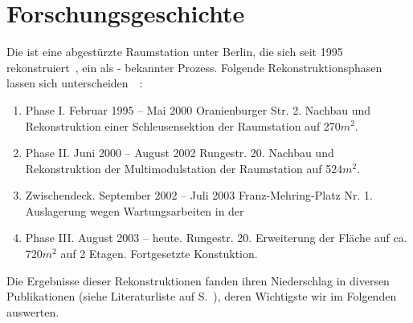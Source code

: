 \section*{Forschungsgeschichte}
\fancyhead[LO]{}

    Die  ist eine abgestürzte Raumstation unter Berlin, die sich seit 1995 rekonstruiert~\cite{cbasebook}, ein als  -  bekannter Prozess. Folgende Rekonstruktionsphasen  lassen sich unterscheiden~\cite{cbasepressemap}~\cite{cbasebook}:
    \begin{enumerate}
        \item Phase I.  Februar 1995 -- Mai 2000 Oranienburger Str. 2.  Nachbau und Rekonstruktion einer Schleusensektion der  Raumstation auf 270$m^2$.~\cite{cbasepressemap}~\cite{cbasebook} 
        \item Phase II.   Juni 2000 -- August 2002 Rungestr. 20.  Nachbau und Rekonstruktion der Multimodulstation  der  Raumstation auf 524$m^2$.~\cite{cbasepressemap}~\cite{cbasebook} 
        \item Zwischendeck.  September 2002 -- Juli 2003 Franz-Mehring-Platz Nr. 1. 
        Auslagerung wegen Wartungsarbeiten in der ~\cite{cbasepressemap}~\cite{cbasebook} 
        \item Phase III.  August 2003 -- heute. Rungestr. 20. 
         Erweiterung der Fläche auf ca. 720$m^2$ auf 2 Etagen. Fortgesetzte Konstuktion.
    \end{enumerate}

Die Ergebnisse dieser Rekonstruktionen fanden ihren Niederschlag in diversen Publikationen (siehe Literaturliste auf S.~\pageref{sec:literatur}), deren Wichtigste wir im Folgenden auswerten. 
